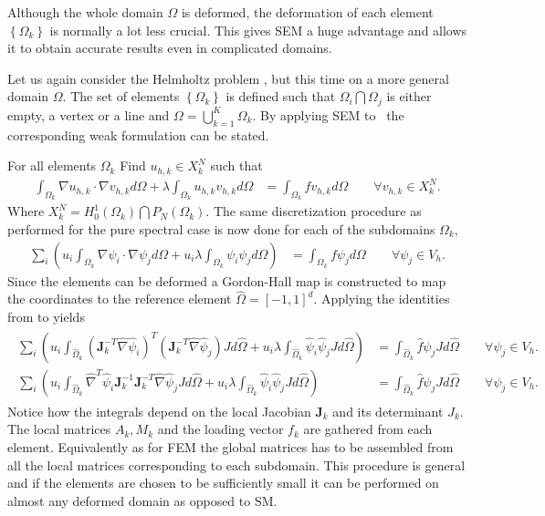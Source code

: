 Although the whole domain $\Omega$ is deformed, the deformation of each
element $\left\{ \Omega_k \right\}$ is normally a lot less crucial. This gives SEM a huge advantage and allows it to 
obtain accurate results even in complicated domains.

Let us again consider the Helmholtz problem , but this time 
on a more general domain $\Omega$. The set of elements $\left\{ \Omega_k \right\}$
is defined such that $\Omega_i\bigcap\Omega_j$ is either empty, a vertex or a line and 
$\Omega = \bigcup^K_{k=1}\Omega_k$.
By applying SEM to~ the corresponding weak formulation can be stated.

For all elements $\Omega_k$ Find $u_{h,k}\in X^N_k$  such that
%
\begin{align}
    \int_{\Omega_k}\nabla u_{h,k} \cdot \nabla v_{h,k} d \Omega
    + \lambda \int_{\Omega_k} u_{h,k} v_{h,k} d \Omega 
    &= \int_{\Omega_k}f v_{h,k}d \Omega \qquad \forall v_{h,k} \in X_k^N.
    \label{eq:HelmholtzweakSEM}
\end{align}
%
Where $X^N_k =  H_0^1(\Omega_k)\bigcap P_N(\Omega_k)$. The same discretization 
procedure as performed for the pure spectral case is now done for each of the 
subdomains $\Omega_k$,
%
\begin{align}
    \sum_i\left(  u_i\int_{\Omega_k}\nabla \psi_i \cdot \nabla \psi_j d \Omega + 
    u_i\lambda \int_{\Omega_k} \psi_i \psi_jd \Omega \right)
    &= \int_{\Omega_k}f \psi_jd \Omega \qquad \forall \psi_j \in V_h.
    \label{eq:HelmholtzdiscreteSEM}
\end{align}
%
Since the elements can be deformed a Gordon-Hall map is 
constructed to map the coordinates to the reference element $\hat{\Omega}=[-1,1]^d$.
Applying the identities from  to  yields
%
\begin{align}
    \begin{split}
    \sum_i\left(  u_i\int_{\hat{\Omega}_k}(\mathbf{J}_k^{-T}\hat{\nabla} \hat{\psi}_i)^T
    (\mathbf{J}_k^{-T}\hat{\nabla} \hat{\psi}_j) J d \hat{\Omega} + 
    u_i\lambda \int_{\hat{\Omega}_k} \hat{\psi}_i \hat{\psi}_j Jd \hat{\Omega} \right)
    &= \int_{\hat{\Omega}_k}\hat{f} \psi_j J d \hat{\Omega} \qquad \forall \psi_j \in V_h.  \\
    \sum_i\left(  u_i\int_{\hat{\Omega}_k}\hat{\nabla}^T \hat{\psi}_i\mathbf{J}_k^{-1}
    \mathbf{J}_k^{-T}\hat{\nabla} \hat{\psi}_j J d \hat{\Omega} + 
    u_i\lambda \int_{\hat{\Omega}_k} \hat{\psi}_i \hat{\psi}_j Jd \hat{\Omega} \right)
    &= \int_{\hat{\Omega}_k}\hat{f} \psi_j J d \hat{\Omega} \qquad \forall \psi_j \in V_h.
    \end{split}
    \label{eq:HelmholtzrefSEM}
\end{align}
%
Notice how the integrals depend on the local Jacobian $\mathbf{J}_k$ and its determinant $J_k$.
The local matrices $A_k,M_k$ and the loading vector $f_k$ are gathered from each element.
Equivalently as for FEM the global matrices has to be assembled
from all the local matrices corresponding to each subdomain. This procedure is general and 
if the elements are chosen to be sufficiently small it can 
be performed on almost any deformed domain as opposed to SM. 

